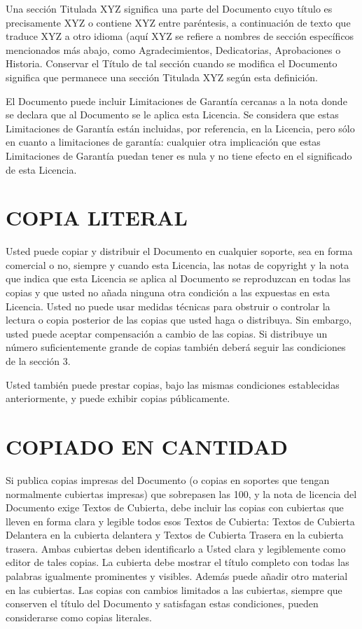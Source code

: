 \documentclass[letterpaper,12pt,titlepage]{article}
\begin{document}
Una sección Titulada XYZ significa una parte del Documento cuyo título es precisamente XYZ o contiene XYZ entre paréntesis, a continuación de texto que traduce XYZ a otro idioma (aquí XYZ se refiere a nombres de sección específicos mencionados más abajo, como Agradecimientos, Dedicatorias, Aprobaciones o Historia. Conservar el Título de tal sección cuando se modifica el Documento significa que permanece una sección Titulada XYZ según esta definición.\par

El Documento puede incluir Limitaciones de Garantía cercanas a la nota donde se declara que al Documento se le aplica esta Licencia. Se considera que estas Limitaciones de Garantía están incluidas, por referencia, en la Licencia, pero sólo en cuanto a limitaciones de garantía: cualquier otra implicación que estas Limitaciones de Garantía puedan tener es nula y no tiene efecto en el significado de esta Licencia.\par

\section{COPIA LITERAL}

Usted puede copiar y distribuir el Documento en cualquier soporte, sea en forma comercial o no, siempre y cuando esta Licencia, las notas de copyright y la nota que indica que esta Licencia se aplica al Documento se reproduzcan en todas las copias y que usted no añada ninguna otra condición a las expuestas en esta Licencia. Usted no puede usar medidas técnicas para obstruir o controlar la lectura o copia posterior de las copias que usted haga o distribuya. Sin embargo, usted puede aceptar compensación a cambio de las copias. Si distribuye un número suficientemente grande de copias también deberá seguir las condiciones de la sección 3.\par

Usted también puede prestar copias, bajo las mismas condiciones establecidas anteriormente, y puede exhibir copias públicamente.\par

\section{COPIADO EN CANTIDAD}

Si publica copias impresas del Documento (o copias en soportes que tengan normalmente cubiertas impresas) que sobrepasen las 100, y la nota de licencia del Documento exige Textos de Cubierta, debe incluir las copias con cubiertas que lleven en forma clara y legible todos esos Textos de Cubierta: Textos de Cubierta Delantera en la cubierta delantera y Textos de Cubierta Trasera en la cubierta trasera. Ambas cubiertas deben identificarlo a Usted clara y legiblemente como editor de tales copias. La cubierta debe mostrar el título completo con todas las palabras igualmente prominentes y visibles. Además puede añadir otro material en las cubiertas. Las copias con cambios limitados a las cubiertas, siempre que conserven el título del Documento y satisfagan estas condiciones, pueden considerarse como copias literales.\par
\end{document}
